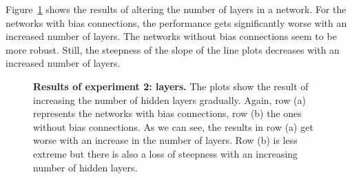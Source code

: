 Figure~\ref{fig:experiment_2_layers} shows the results of altering the number of layers in a network. For the networks with bias connections, the performance gets significantly worse with an increased number of layers. The networks without bias connections seem to be more robust. Still, the steepness of the slope of the line plots decreases with an increased number of layers.
\begin{figure}[!ht]
\begin{figrow}
\item \label{row:NN_with_bias_layers} 
\item \label{row:NN_without_layers}  
\end{figrow}
\caption[Results of experiment 2: layers]{
  \textbf{Results of experiment 2: layers.}
   The plots show the result of increasing the number of hidden layers gradually. Again, row (a) represents the networks with bias connections, row (b) the ones without bias connections. As we can see, the results in row (a) get worse with an increase in the number of layers. Row (b) is less extreme but there is also a loss of steepness with an increasing number of hidden layers.
}
\label{fig:experiment_2_layers}
\end{figure}

